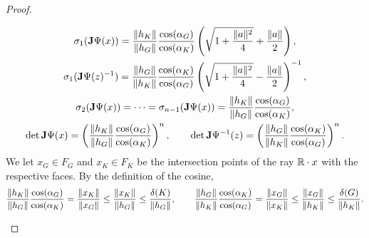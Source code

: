\documentclass[10pt,a4paper]{article}
\begin{document}
\begin{proof}
\begin{itemize}
\begin{gather*}
            \sigma_{1}( {\mathbf{J}}\Psi(x) )
            = 
            \frac{ \|  h_K  \| }{ \|  h_{{G}}  \| }
            \frac{ \cos(\alpha_{{G}}) }{ \cos(\alpha_K) }
            \left( 
                \sqrt{ 1 + \frac{ \| a \|^{2} }{ 4 } } + \frac{ \| a \| }{2}
            \right)
            ,
            \\
            \sigma_{1}( {\mathbf{J}}\Psi(z)^{-1} )
            = 
            \frac{ \|  h_{{G}}  \| }{ \|  h_K  \| }
            \frac{ \cos(\alpha_K) }{ \cos(\alpha_{{G}}) }
            \left( 
                \sqrt{ 1 + \frac{ \| a \|^{2} }{ 4 } } - \frac{ \| a \| }{2}
            \right)^{-1},
            \\
            \sigma_{2}( {\mathbf{J}}\Psi(x) ) = \dots = \sigma_{n-1}( {\mathbf{J}}\Psi(x) )
            =
            \frac{ \|  h_K  \| }{ \|  h_{{G}}  \| }
            \frac{ \cos(\alpha_{{G}}) }{ \cos(\alpha_K) }
            ,
            \\
            \det{\mathbf{J}}\Psi(x)
            =
            \left( 
            \frac{ \|  h_K  \| }{ \|  h_{{G}}  \| }
            \frac{ \cos(\alpha_{{G}}) }{ \cos(\alpha_K) }
            \right)^{n},
            \qquad
            \det{\mathbf{J}}\Psi^{-1}(z)
            =
            \left( 
            \frac{ \|  h_{{G}}  \| }{ \|  h_{K}  \| }
            \frac{ \cos(\alpha_{K}) }{ \cos(\alpha_{{G}}) }
            \right)^{n}
            .
        \end{gather*}
        We let $x_{G} \in F_{G}$ and $x_{K} \in F_{K}$ be the intersection points of the ray ${\mathbb R} \cdot x$ with the respective faces.
        By the definition of the cosine, 
        \begin{align*}
            \frac{ \vecnorm{ h_K } }{ \vecnorm{ h_{{G}} } }
            \frac{ \cos(\alpha_{{G}}) }{ \cos(\alpha_K) }
            = 
            \frac{ \vecnorm{ x_K } }{ \vecnorm{ x_{{G}} } }
            \leq 
            \frac{ \vecnorm{ x_K } }{ \vecnorm{ h_{{G}} } }
            \leq 
            \frac{ \diam(K) }{ \vecnorm{ h_{{G}} } }
            ,
            \qquad 
            \frac{ \vecnorm{ h_{{G}} } }{ \vecnorm{ h_K } }
            \frac{ \cos(\alpha_K) }{ \cos(\alpha_{{G}}) }
            = 
            \frac{ \vecnorm{ x_{G} } }{ \vecnorm{ x_{K} } }
            \leq 
            \frac{ \vecnorm{ x_{G} } }{ \vecnorm{ h_{K} } }
            \leq 
            \frac{ \diam(G) }{ \vecnorm{ h_{K} } }
            .

\end{align*}
\end{itemize}
\end{proof}
\end{document}
